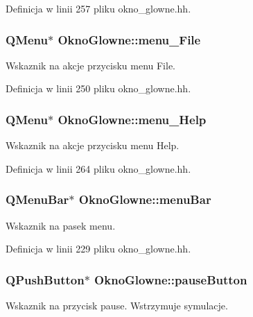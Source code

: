 Definicja w linii 257 pliku okno\-\_\-glowne.\-hh.

\hypertarget{class_okno_glowne_a1ba162db2d0b06b0f8963e61b3806875}{
\subsubsection[{menu\-\_\-\-File}]{\setlength{\rightskip}{0pt plus 5cm}Q\-Menu$\ast$ Okno\-Glowne\-::menu\-\_\-\-File\hspace{0.3cm}{\ttfamily [private]}}}\label{class_okno_glowne_a1ba162db2d0b06b0f8963e61b3806875}
Wskaznik na akcje przycisku menu File. 

Definicja w linii 250 pliku okno\-\_\-glowne.\-hh.

\hypertarget{class_okno_glowne_ab17be6714913af0cdf4e7de7cb6210d1}{
\subsubsection[{menu\-\_\-\-Help}]{\setlength{\rightskip}{0pt plus 5cm}Q\-Menu$\ast$ Okno\-Glowne\-::menu\-\_\-\-Help\hspace{0.3cm}{\ttfamily [private]}}}\label{class_okno_glowne_ab17be6714913af0cdf4e7de7cb6210d1}
Wskaznik na akcje przycisku menu Help. 

Definicja w linii 264 pliku okno\-\_\-glowne.\-hh.

\hypertarget{class_okno_glowne_a5a87098d9d4bd868670f5a5e72023a0a}{
\subsubsection[{menu\-Bar}]{\setlength{\rightskip}{0pt plus 5cm}Q\-Menu\-Bar$\ast$ Okno\-Glowne\-::menu\-Bar\hspace{0.3cm}{\ttfamily [private]}}}\label{class_okno_glowne_a5a87098d9d4bd868670f5a5e72023a0a}
Wskaznik na pasek menu. 

Definicja w linii 229 pliku okno\-\_\-glowne.\-hh.

\hypertarget{class_okno_glowne_a0dde8df8a49b8f47f17f8e748fd15967}{
\subsubsection[{pause\-Button}]{\setlength{\rightskip}{0pt plus 5cm}Q\-Push\-Button$\ast$ Okno\-Glowne\-::pause\-Button\hspace{0.3cm}{\ttfamily [private]}}}\label{class_okno_glowne_a0dde8df8a49b8f47f17f8e748fd15967}
Wskaznik na przycisk pause. Wstrzymuje symulacje. 

